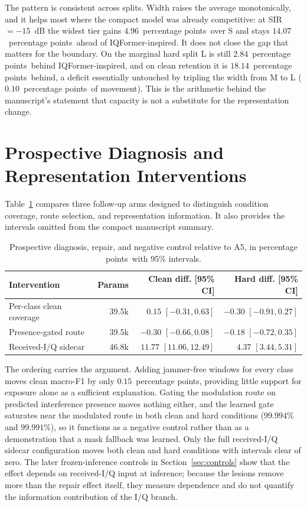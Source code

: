 \documentclass[letterpaper,onecolumn,11pt,journal]{IEEEtran}
\newcommand{\pp}{percentage points}
\begin{document}
The pattern is consistent across splits. Width raises the average
monotonically, and it helps most where the compact model was already
competitive: at SIR $=-15$~dB the widest tier gains $4.96$~\pp\ over S and
stays $14.07$~\pp\ ahead of IQFormer-inspired. It does not close the gap that
matters for the boundary. On the marginal hard split L is still $2.84$~\pp\
behind IQFormer-inspired, and on clean retention it is $18.14$~\pp\ behind,
a deficit essentially untouched by tripling the width from M to L
($0.10$~\pp\ of movement). This is the arithmetic behind the manuscript's
statement that capacity is not a substitute for the representation change.

\section{Prospective Diagnosis and Representation Interventions}
Table~\ref{tab:tier2s} compares three follow-up arms designed to distinguish
condition coverage, route selection, and representation information. It also
provides the intervals omitted from the compact manuscript summary.

\begin{table}[t]
\centering
\caption{Prospective diagnosis, repair, and negative control relative to A5,
in \pp\ with 95\% intervals.}
\label{tab:tier2s}
\footnotesize
\setlength{\tabcolsep}{2.6pt}
\begin{tabular}{lrrr}
\toprule
Intervention & Params & Clean diff. [95\% CI] & Hard diff. [95\% CI]\\
\midrule
Per-class clean coverage & 39.5k & $0.15$ $[-0.31,0.63]$ & $-0.30$ $[-0.91,0.27]$\\
Presence-gated route & 39.5k & $-0.30$ $[-0.66,0.08]$ & $-0.18$ $[-0.72,0.35]$\\
Received-I/Q sidecar & 46.8k & $11.77$ $[11.06,12.49]$ & $4.37$ $[3.44,5.31]$\\
\bottomrule
\end{tabular}
\end{table}

The ordering carries the argument. Adding jammer-free windows for every class
moves clean macro-F1 by only $0.15$~\pp, providing little support for exposure
alone as a sufficient explanation.
Gating the modulation route on predicted interference presence moves nothing
either, and the learned gate saturates near the modulated route in both clean
and hard conditions ($99.994\%$ and $99.991\%$), so it functions as a negative
control rather than as a demonstration that a mask fallback was learned. Only
the full received-I/Q sidecar configuration moves both clean and hard
conditions with intervals clear of zero. The later frozen-inference controls
in Section~\ref{sec:controls} show that the effect depends on received-I/Q
input at inference; because the lesions remove more than the repair effect
itself, they measure dependence and do not quantify the information
contribution of the I/Q branch.
\end{document}
